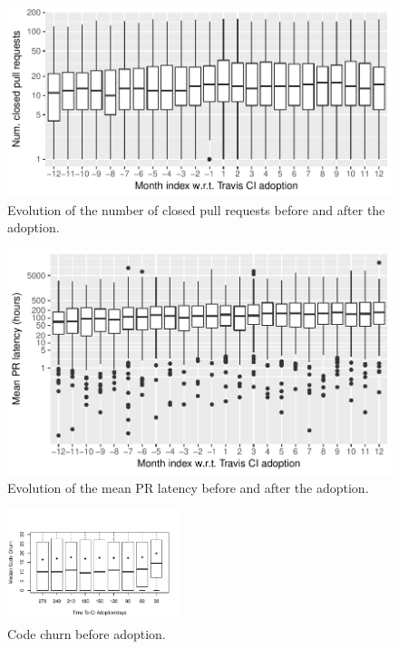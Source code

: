 \begin{figure}[t]
\centering
\includegraphics[width=\columnwidth, clip=true, trim=0 0 0 0]{figures/prs-full.pdf}
\caption{Evolution of the number of closed pull requests before and after the \Tvis adoption.}
\label{fig:prs}
\end{figure}


\begin{figure}[t]
\centering
\includegraphics[width=\columnwidth, clip=true, trim=0 0 0 0]{figures/pr-latency-mean.pdf}
\caption{Evolution of the mean PR latency before and after the \Tvis adoption.}
\label{fig:pr-latency}
\end{figure}








\begin{figure}[t]
\centering
\includegraphics[width=0.45\textwidth, clip=true, trim=0 15 15 50]{churn_before.pdf}
\caption{Code churn before \Tvis adoption.}
\label{Fig:CodeChurnBefore}\vspace{-0.3cm}
\end{figure}


